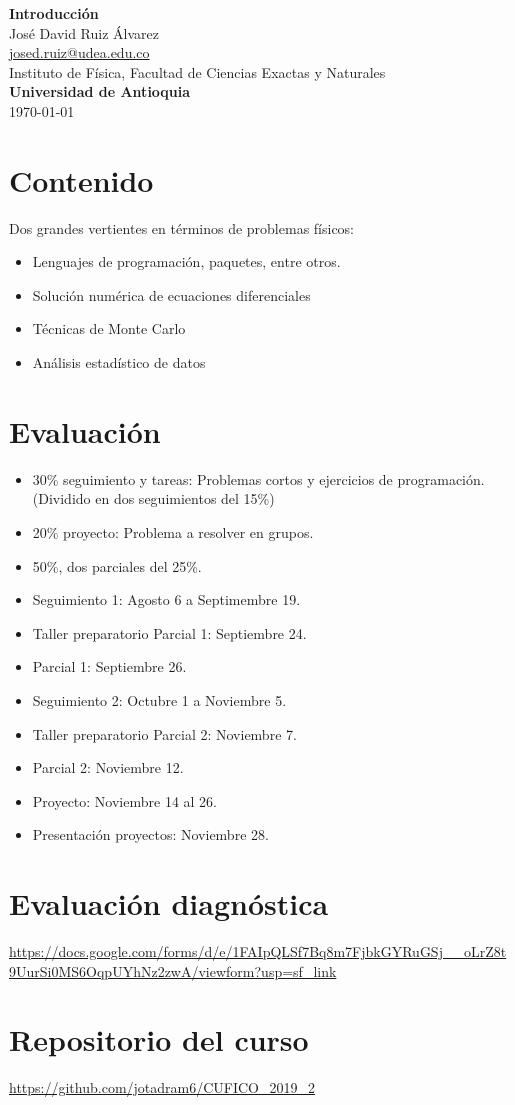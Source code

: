 \documentclass[10.5pt]{article}
\begin{document}
\noindent
\begin{minipage}[b]{0.75\linewidth}
{\LARGE\bf Introducción}\\ %
\large{Jos\'{e} David Ruiz \'{A}lvarez} \\
\small{\href{mailto:josed.ruiz@udea.edu.co}{josed.ruiz@udea.edu.co}} \\ %
\normalsize{Instituto de Física, Facultad de Ciencias Exactas y Naturales} \\%
\normalsize{\bf Universidad de Antioquia} \\[8mm]
\today %
\end{minipage}%

\section{Contenido}

Dos grandes vertientes en t\'{e}rminos de problemas f\'{i}sicos: 
\begin{itemize}
\item Lenguajes de programación, paquetes, entre otros.
\item Solución numérica de ecuaciones diferenciales
\item Técnicas de Monte Carlo
\item Análisis estadístico de datos
\end{itemize}

\section{Evaluación}

\begin{itemize}
\item 30\% seguimiento y tareas: Problemas cortos y ejercicios de programación. (Dividido en dos seguimientos del 15\%)
\item 20\% proyecto: Problema a resolver en grupos.
\item 50\%, dos parciales del 25\%. 
\end{itemize}

\begin{itemize}
\item Seguimiento 1: Agosto 6 a Septimembre 19.
\item Taller preparatorio Parcial 1: Septiembre 24.
\item Parcial 1: Septiembre 26.
\item Seguimiento 2: Octubre 1 a Noviembre 5.
\item Taller preparatorio Parcial 2: Noviembre 7.
\item Parcial 2: Noviembre 12.
\item Proyecto: Noviembre 14 al 26.
\item Presentación proyectos: Noviembre 28.
\end{itemize}

\section{Evaluación diagnóstica}

\url{https://docs.google.com/forms/d/e/1FAIpQLSf7Bq8m7FjbkGYRuGSj__oLrZ8t9UurSi0MS6OqpUYhNz2zwA/viewform?usp=sf_link}

\section{Repositorio del curso}

\url{https://github.com/jotadram6/CUFICO_2019_2}
\end{document}
